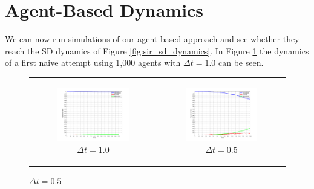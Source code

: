 \section{Agent-Based Dynamics}
We can now run simulations of our agent-based approach and see whether they reach the SD dynamics of Figure \ref{fig:sir_sd_dynamics}. In Figure \ref{fig:sir_abs_approximating_1dt} the dynamics of a first naive attempt using 1,000 agents with $\Delta t= 1.0$ can be seen. 

\begin{figure}
\begin{center}
	\begin{tabular}{c c}
		\begin{subfigure}[b]{0.3\textwidth}
			\centering
			\includegraphics[width=1\textwidth, angle=0]{./shared/fig/frabs/SIR_1000agents_150t_1dt_NOSS_parallel.png}
			\caption{$\Delta t = 1.0$}
			\label{fig:sir_abs_approximating_1dt}
		\end{subfigure}
    	&
		\begin{subfigure}[b]{0.3\textwidth}
			\centering
			\includegraphics[width=1\textwidth, angle=0]{./shared/fig/frabs/SIR_1000agents_150t_05dt_NOSS_parallel.png}
			\caption{$\Delta t = 0.5$}
			\label{fig:sir_abs_approximating_05dt}
		\end{subfigure}
    	

\end{tabular}
\end{center}
\end{figure}
